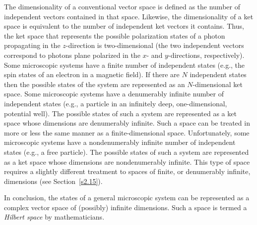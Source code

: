 The dimensionality of a conventional vector space is defined as the number
of independent vectors contained in that space. Likewise, the dimensionality
of a ket space is equivalent to the number of independent ket vectors it contains. 
Thus, the ket space that represents the possible polarization 
states of a photon propagating in the $z$-direction is two-dimensional
(the two independent vectors correspond to photons plane polarized in the
$x$- and $y$-directions, respectively). Some microscopic
systems have a finite number of independent states ({\rm e.g.}, the spin states
of an electron in a magnetic field). If there are $N$ independent states 
then the possible states of the 
system are represented as an  $N$-dimensional ket space.  Some microscopic
systems have a denumerably infinite number of independent states ({\rm e.g.},
a particle in an infinitely deep, one-dimensional, potential well). 
The possible states of such a system are represented as a ket space whose
dimensions are denumerably infinite. Such a space can be treated in more or
less the same manner as a finite-dimensional space. Unfortunately, some
microscopic systems have a nondenumerably infinite number of independent states
({\rm e.g.}, a free particle). The possible states  of such a system are represented
as a ket space whose dimensions are nondenumerably infinite. This type of
space requires a slightly different treatment to spaces of finite, or
denumerably infinite, dimensions (see Section~\ref{s2.15}).

In conclusion, the  states of a general microscopic system can be  represented
as a complex vector space of (possibly) infinite dimensions. Such a space
is termed a {\em Hilbert space}\/ by mathematicians.

